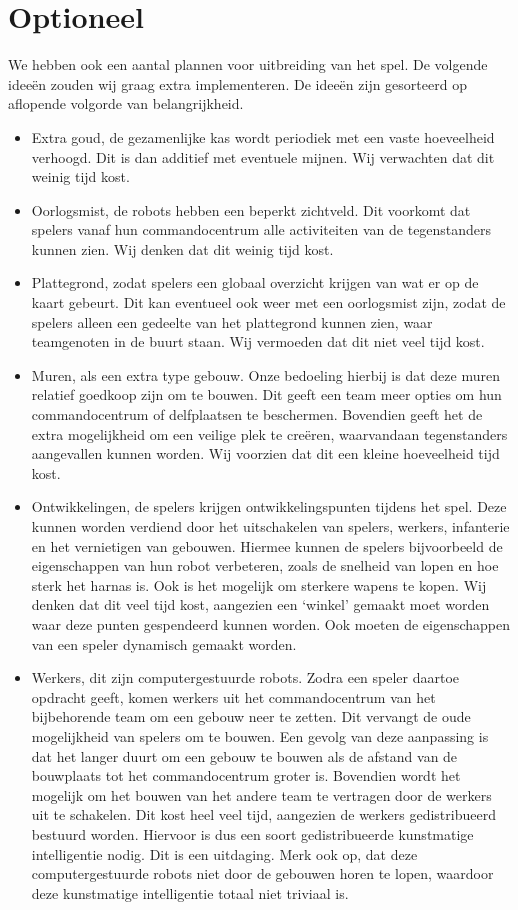 \section{Optioneel}
\label{sec:OPT}
We hebben ook een aantal plannen voor uitbreiding van het spel. De volgende idee\"en zouden wij graag extra implementeren. De idee\"en zijn gesorteerd op aflopende volgorde van belangrijkheid.

\begin{itemize}
  \item Extra goud, de gezamenlijke kas wordt periodiek met een vaste hoeveelheid verhoogd. Dit is dan additief met eventuele mijnen. Wij verwachten dat dit weinig tijd kost.
  \item Oorlogsmist, de robots hebben een beperkt zichtveld. Dit voorkomt dat spelers vanaf hun commandocentrum alle activiteiten van de tegenstanders kunnen zien. Wij denken dat dit weinig tijd kost.
  \item Plattegrond, zodat spelers een globaal overzicht krijgen van wat er op de kaart gebeurt. Dit kan eventueel ook weer met een oorlogsmist zijn, zodat de spelers alleen een gedeelte van het plattegrond kunnen zien, waar teamgenoten in de buurt staan. Wij vermoeden dat dit niet veel tijd kost.
  \item Muren, als een extra type gebouw. Onze bedoeling hierbij is dat deze muren relatief goedkoop zijn om te bouwen. Dit geeft een team meer opties om hun commandocentrum of delfplaatsen te beschermen. Bovendien geeft het de extra mogelijkheid om een veilige plek te cre\"eren, waarvandaan tegenstanders aangevallen kunnen worden. Wij voorzien dat dit een kleine hoeveelheid tijd kost.
  \item Ontwikkelingen, de spelers krijgen ontwikkelingspunten tijdens het spel. Deze kunnen worden verdiend door het uitschakelen van spelers, werkers, infanterie en het vernietigen van gebouwen. Hiermee kunnen de spelers bijvoorbeeld de eigenschappen van hun robot verbeteren, zoals de snelheid van lopen en hoe sterk het harnas is. Ook is het mogelijk om sterkere wapens te kopen. Wij denken dat dit veel tijd kost, aangezien een `winkel' gemaakt moet worden waar deze punten gespendeerd kunnen worden. Ook moeten de eigenschappen van een speler dynamisch gemaakt worden.
  \item Werkers, dit zijn computergestuurde robots. Zodra een speler daartoe opdracht geeft, komen werkers uit het commandocentrum van het bijbehorende team om een gebouw neer te zetten. Dit vervangt de oude mogelijkheid van spelers om te bouwen. Een gevolg van deze aanpassing is dat het langer duurt om een gebouw te bouwen als de afstand van de bouwplaats tot het commandocentrum groter is. Bovendien wordt het mogelijk om het bouwen van het andere team te vertragen door de werkers uit te schakelen. Dit kost heel veel tijd, aangezien de werkers gedistribueerd bestuurd worden. Hiervoor is dus een soort gedistribueerde kunstmatige intelligentie nodig. Dit is een uitdaging. Merk ook op, dat deze computergestuurde robots niet door de gebouwen horen te lopen, waardoor deze kunstmatige intelligentie totaal niet triviaal is.

\end{itemize}
